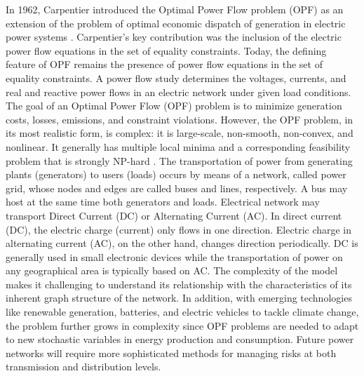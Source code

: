 \documentclass[11pt,a4paper,oneside,openany]{book}
\numberwithin{definition}{section}
\numberwithin{theorem}{section}
\numberwithin{problem}{section}
\begin{document}
 In 1962, Carpentier introduced the Optimal Power Flow problem (OPF) as an extension of the problem of optimal economic dispatch of generation in electric power systems \cite{CARPENTIER19793}. Carpentier's key contribution was the inclusion of the electric power flow equations in the set of equality constraints. Today, the defining feature of OPF remains the presence of power flow equations in the set of equality constraints. A power flow study determines the voltages, currents, and real and reactive power flows in an electric network under given load conditions. The goal of an Optimal Power Flow (OPF) problem is to minimize generation costs, losses, emissions, and constraint violations. However, the OPF problem, in its most realistic form, is complex: it is large-scale, non-smooth, non-convex, and nonlinear. It generally has multiple local minima and a corresponding feasibility problem that is strongly NP-hard \cite{BIENSTOCK2019494}. 
 The transportation of power from generating plants (generators) to users (loads) occurs by means of a network, called power grid, whose nodes and edges are called buses and lines, respectively. A bus may host at the same time both generators and loads. Electrical network may transport Direct Current (DC) or Alternating Current (AC). In direct current (DC), the electric charge (current) only flows in one direction. Electric charge in alternating current (AC), on the other hand, changes direction periodically. DC is generally used in small electronic devices while the transportation of power on any geographical area is typically based on AC. The complexity of the model makes it challenging to understand its relationship with the characteristics of its inherent graph structure of the network.
 In addition, with emerging technologies like renewable generation, batteries, and electric vehicles to tackle climate change, the problem further grows in complexity since OPF problems are needed to adapt to new stochastic variables in energy production and consumption. Future power networks will require more sophisticated methods for managing risks at both transmission and distribution levels. 
 
\end{document}
